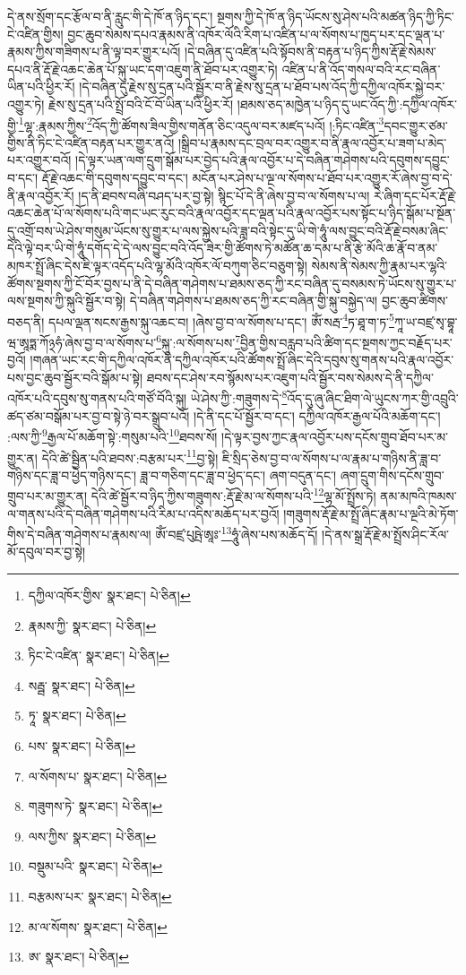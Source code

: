 དེ་ནས་སྲོག་དང་རྩོལ་བ་ནི་རླུང་གི་དེ་ཁོ་ན་ཉིད་དང་། སྔགས་ཀྱི་དེ་ཁོ་ན་ཉིད་ཡོངས་སུ་ཤེས་པའི་མཚན་ཉིད་ཀྱི་ཏིང་ངེ་འཛིན་གྱིས། བྱང་ཆུབ་སེམས་དཔའ་རྣམས་ནི་འཁོར་ལོའི་རིག་པ་འཛིན་པ་ལ་སོགས་པ་ཁྱད་པར་དང་ལྡན་པ་རྣམས་ཀྱིས་གཟིགས་པ་ནི་ལྟ་བར་གྱུར་པའོ། །དེ་བཞིན་དུ་འཛིན་པའི་སྟོབས་ནི་བརྟན་པ་ཉིད་ཀྱིས་རྡོ་རྗེ་སེམས་དཔའ་ནི་རྡོ་རྗེ་འཆང་ཆེན་པོ་སྐུ་ཡང་དག་འཇུག་ནི་ཐོབ་པར་འགྱུར་ཏེ། འཛིན་པ་ནི་འོད་གསལ་བའི་རང་བཞིན་ཡིན་པའི་ཕྱིར་རོ། །དེ་བཞིན་དུ་རྗེས་སུ་དྲན་པའི་སྦྱོར་བ་ནི་རྗེས་སུ་དྲན་པ་ཐོབ་པས་འོད་ཀྱི་དཀྱིལ་འཁོར་སྐྱེ་བར་འགྱུར་ཏེ། རྗེས་སུ་དྲན་པའི་སྤྲོ་བའི་ངོ་བོ་ཡིན་པའི་ཕྱིར་རོ། །ཐམས་ཅད་མཁྱེན་པ་ཉིད་དུ་ཡང་འོད་ཀྱི་:དཀྱིལ་འཁོར་གྱི་\footnote{དཀྱིལ་འཁོར་གྱིས་  སྣར་ཐང་།  པེ་ཅིན། }ལྷ་:རྣམས་ཀྱིས་\footnote{རྣམས་ཀྱི་  སྣར་ཐང་།  པེ་ཅིན། }འོད་ཀྱི་ཚོགས་ཟིལ་གྱིས་གནོན་ཅིང་འདུལ་བར་མཛད་པའོ། །:ཏིང་འཛིན་\footnote{ཏིང་ངེ་འཛིན་  སྣར་ཐང་།  པེ་ཅིན། }དབང་གྱུར་ཙམ་གྱིས་ནི་ཏིང་ངེ་འཛིན་བརྟན་པར་གྱུར་ནའོ། །སྒྲིབ་པ་རྣམས་དང་བྲལ་བར་འགྱུར་བ་ནི་རྣལ་འབྱོར་པ་ཟག་པ་མེད་པར་འགྱུར་བའོ། །དེ་ལྟར་ཡན་ལག་དྲུག་སྒོམ་པར་བྱེད་པའི་རྣལ་འབྱོར་པ་དེ་བཞིན་གཤེགས་པའི་དབུགས་དབྱུང་བ་དང་། རྡོ་རྗེ་འཆང་གི་དབུགས་དབྱུང་བ་དང་། མངོན་པར་ཤེས་པ་ལྔ་ལ་སོགས་པ་ཐོབ་པར་འགྱུར་རོ་ཞེས་བྱ་བ་དེ་ནི་རྣལ་འབྱོར་རོ། །ད་ནི་ཐབས་བཞི་བཤད་པར་བྱ་སྟེ། སྙིང་པོ་དེ་ནི་ཞེས་བྱ་བ་ལ་སོགས་པ་ལ། རེ་ཞིག་དང་པོར་རྡོ་རྗེ་འཆང་ཆེན་པོ་ལ་སོགས་པའི་གང་ཡང་རུང་བའི་རྣལ་འབྱོར་དང་ལྡན་པའི་རྣལ་འབྱོར་པས་སྟོང་པ་ཉིད་སྒོམ་པ་སྔོན་དུ་འགྲོ་བས་ཡེ་ཤེས་གསུམ་ཡོངས་སུ་གྱུར་པ་ལས་སྐྱེས་པའི་ཟླ་བའི་སྟེང་དུ་ཡི་གེ་ཧཱུཾ་ལས་བྱུང་བའི་རྡོ་རྗེ་བསམ་ཞིང་དེའི་ལྟེ་བར་ཡི་གེ་ཧཱུཾ་དགོད་དེ་དེ་ལས་བྱུང་བའི་འོད་ཟེར་གྱི་ཚོགས་ཏེ་མཚོན་ཆ་དམ་པ་ནི་རྩེ་མོའི་ཆ་རྣོ་བ་ནམ་མཁར་སྤྲོ་ཞིང་དེས་ཇི་ལྟར་འདོད་པའི་ལྷ་མོའི་འཁོར་ལོ་བཀུག་ཅིང་བཅུག་སྟེ། སེམས་ནི་སེམས་ཀྱི་རྣམ་པར་ལྷའི་ཚོགས་སྔགས་ཀྱི་ངོ་བོར་བྱས་པ་ནི་དེ་བཞིན་གཤེགས་པ་ཐམས་ཅད་ཀྱི་རང་བཞིན་དུ་བསམས་ཏེ་ཡོངས་སུ་གྱུར་པ་ལས་སྔགས་ཀྱི་སྐུའི་སྦྱོར་བ་སྟེ། དེ་བཞིན་གཤེགས་པ་ཐམས་ཅད་ཀྱི་རང་བཞིན་གྱི་སྐུ་བསྐྱེད་ལ། བྱང་ཆུབ་ཚིགས་བཅད་ནི། དཔལ་ལྡན་སངས་རྒྱས་སྐུ་འཆང་བ། །ཞེས་བྱ་བ་ལ་སོགས་པ་དང་། ཨོཾ་སརྦ་\footnote{སརྦྦ་  སྣར་ཐང་།  པེ་ཅིན། }ཏ་ཐཱ་ག་ཏ་\footnote{ཏཱ་  སྣར་ཐང་།  པེ་ཅིན། }ཀཱ་ཡ་བཛྲ་སྭ་བྷཱ་ཝ་ཨཱཏྨ་ཀོ྅ཧཾ་ཞེས་བྱ་བ་ལ་སོགས་པ་\footnote{པས་  སྣར་ཐང་།  པེ་ཅིན། }སྐུ་:ལ་སོགས་པས་\footnote{ལ་སོགས་པ་  སྣར་ཐང་།  པེ་ཅིན། }བྱིན་གྱིས་བརླབ་པའི་ཚིག་དང་སྔགས་ཀྱང་བརྗོད་པར་བྱའོ། །གཞན་ཡང་རང་གི་དཀྱིལ་འཁོར་ནི་དཀྱིལ་འཁོར་པའི་ཚོགས་སྤྲོ་ཞིང་དེའི་དབུས་སུ་གནས་པའི་རྣལ་འབྱོར་པས་བྱང་ཆུབ་སྦྱོར་བའི་སྒོམ་པ་སྟེ། ཐབས་དང་ཤེས་རབ་སྙོམས་པར་འཇུག་པའི་སྦྱོར་བས་སེམས་དེ་ནི་དཀྱིལ་འཁོར་པའི་དབུས་སུ་གནས་པའི་གཙོ་བོའི་སྐུ། ཡེ་ཤེས་ཀྱི་:གཟུགས་དེ་\footnote{གཟུགས་ཏེ་  སྣར་ཐང་།  པེ་ཅིན། }འོད་དུ་ཞུ་ཞིང་ཐིག་ལེ་ཡུངས་ཀར་གྱི་འབྲུའི་ཚད་ཙམ་བསྒོམ་པར་བྱ་བ་སྟེ་ཉེ་བར་སྒྲུབ་པའོ། །དེ་ནི་དང་པོ་སྦྱོར་བ་དང་། དཀྱིལ་འཁོར་རྒྱལ་པོའི་མཆོག་དང་། :ལས་ཀྱི་\footnote{ལས་ཀྱིས་  སྣར་ཐང་།  པེ་ཅིན། }རྒྱལ་པོ་མཆོག་སྟེ་:གསུམ་པའི་\footnote{བསྡུམ་པའི་  སྣར་ཐང་།  པེ་ཅིན། }ཐབས་སོ། །དེ་ལྟར་བྱས་ཀྱང་རྣལ་འབྱོར་པས་དངོས་གྲུབ་ཐོབ་པར་མ་གྱུར་ན། དེའི་ཚེ་སྦྱིན་པའི་ཐབས་:བརྩམ་པར་\footnote{བརྩམས་པར་  སྣར་ཐང་།  པེ་ཅིན། }བྱ་སྟེ། ཇི་སྲིད་ཅེས་བྱ་བ་ལ་སོགས་པ་ལ་རྣམ་པ་གཉིས་ནི་ཟླ་བ་གཉིས་དང་ཟླ་བ་ཕྱེད་གཉིས་དང་། ཟླ་བ་གཅིག་དང་ཟླ་བ་ཕྱེད་དང་། ཞག་བདུན་དང་། ཞག་དྲུག་གིས་དངོས་གྲུབ་གྲུབ་པར་མ་གྱུར་ན། དེའི་ཚེ་སྦྱོར་བ་ཉིད་ཀྱིས་གཟུགས་:རྡོ་རྗེ་མ་ལ་སོགས་པའི་\footnote{མ་ལ་སོགས་  སྣར་ཐང་།  པེ་ཅིན། }ལྷ་མོ་སྤྲོས་ཏེ། ནམ་མཁའི་ཁམས་ལ་གནས་པའི་དེ་བཞིན་གཤེགས་པའི་རིམ་པ་འདིས་མཆོད་པར་བྱའོ། །གཟུགས་རྡོ་རྗེ་མ་སྤྲོ་ཞིང་རྣམ་པ་ལྔའི་མེ་ཏོག་གིས་དེ་བཞིན་གཤེགས་པ་རྣམས་ལ། ཨོཾ་བཛྲ་པུཥྤེ་ཨཱཿ་\footnote{ཨ་  སྣར་ཐང་།  པེ་ཅིན། }ཧཱུཾ་ཞེས་པས་མཆོད་དོ། །དེ་ནས་སྒྲ་རྡོ་རྗེ་མ་སྤྲོས་ཤིང་རོལ་མོ་དབུལ་བར་བྱ་སྟེ། 